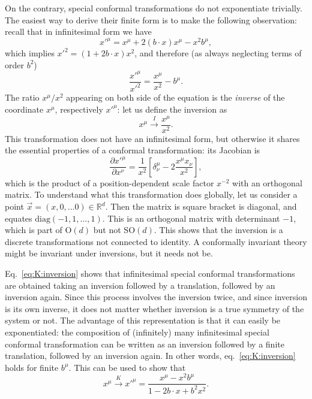 \documentclass[a4paper,12pt]{article}
\newcommand{\SO}{\text{SO}}
\numberwithin{equation}{section}
\begin{document}
On the contrary, special conformal transformations do not exponentiate trivially. The easiest way to derive their finite form is to make the following observation: recall that in infinitesimal form we have
\begin{equation}
	x'^\mu = x^\mu + 2 (b \cdot x) x^\mu - x^2 b^\mu,
\end{equation}
which implies $x'^2 = \left( 1 + 2 b \cdot x \right) x^2$, and therefore (as always neglecting terms of order $b^2$)
\begin{equation}
	\frac{x'^\mu}{x'^2}
	= \frac{x^\mu}{x^2} - b^\mu.
	\label{eq:K:inversion}
\end{equation}
The ratio $x^\mu/x^2$ appearing on both side of the equation is the \emph{inverse} of the coordinate $x^\mu$, respectively $x'^\mu$: let us define the inversion as
\begin{equation}
	x^\mu \xrightarrow{I} \frac{x^\mu}{x^2}.
\end{equation}
This transformation does not have an infinitesimal form, but otherwise it shares the essential properties of a conformal transformation: its Jacobian is
\begin{equation}
	\frac{\partial x'^\mu}{\partial x^\nu}
	= \frac{1}{x^2}
	\left[ \delta^\mu_\nu - 2 \frac{x^\mu x_\nu}{x^2} \right],
\end{equation}
which is the product of a position-dependent scale factor $x^{-2}$ with an orthogonal matrix. To understand what this transformation does globally, let us consider a point $\vec{x} = (x, 0, \ldots 0) \in \mathds{R}^d$. Then the matrix is square bracket is diagonal, and equates $\text{diag}(-1, 1, \ldots, 1)$. This is an orthogonal matrix with determinant $-1$, which is part of $\text{O}(d)$ but not $\SO(d)$. This shows that the inversion is a discrete transformations not connected to identity.
A conformally invariant theory might be invariant under inversions, but it needs not be.

Eq.~\eqref{eq:K:inversion} shows that infinitesimal special conformal transformations are obtained taking an inversion followed by a translation, followed by an inversion again. Since this process involves the inversion twice, and since inversion is its own inverse, it does not matter whether inversion is a true symmetry of the system or not.
The advantage of this representation is that it can easily be exponentiated: the composition of (infinitely) many infinitesimal special conformal transformation can be written as an inversion followed by a finite translation, followed by an inversion again. In other words, eq.~\eqref{eq:K:inversion} holds for finite $b^\mu$.
This can be used to show that
\begin{equation}
	x^\mu \xrightarrow{K}
	x'^\mu = \frac{x^\mu - x^2 b^\mu}
	{1 - 2 b \cdot x + b^2 x^2}.
	\label{eq:K:finite}
\end{equation}
\end{document}
